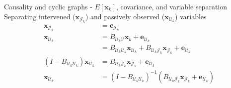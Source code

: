 \begin{frame}{Causality and cyclic graphs - $E[\boldsymbol{x}_k]$, covariance, and variable separation}
Separating intervened ($\boldsymbol{x}_{\mathcal{J}_k}$) and passively observed ($\boldsymbol{x}_{\mathcal{U}_k}$) variables
\begin{subequations}
\label{eq:JU}
\begin{align}
\boldsymbol{x}_{\mathcal{J}_k} &= \boldsymbol{c}_{\mathcal{J}_k}
\\
\boldsymbol{x}_{\mathcal{U}_k} &= B_{\mathcal{U}_k\mathcal{V}} \boldsymbol{x}_k + \boldsymbol{e}_{\mathcal{U}_k}
\\
&= B_{\mathcal{U}_k\mathcal{U}_k} \boldsymbol{x}_{\mathcal{U}_k} + B_{\mathcal{U}_k\mathcal{J}_k} \boldsymbol{x}_{\mathcal{J}_k} + \boldsymbol{e}_{\mathcal{U}_k}
\\
(I - B_{\mathcal{U}_k\mathcal{U}_k}) \boldsymbol{x}_{\mathcal{U}_k} &=
B_{\mathcal{U}_k\mathcal{J}_k}\boldsymbol{x}_{\mathcal{J}_k} + \boldsymbol{e}_{\mathcal{U}_k}
\\
\boldsymbol{x}_{\mathcal{U}_k} &=
(I - B_{\mathcal{U}_k\mathcal{U}_k})^{-1}(B_{\mathcal{U}_k\mathcal{J}_k}\boldsymbol{x}_{\mathcal{J}_k} + \boldsymbol{e}_{\mathcal{U}_k})
\end{align}
\end{subequations}
\end{frame}


